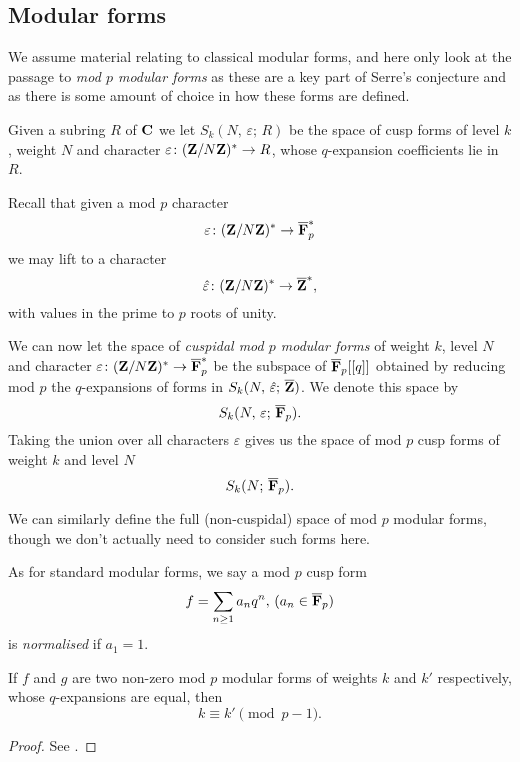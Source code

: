 \documentclass[a4paper,12pt]{article}
\begin{document}
\subsection{Modular forms}
We assume material relating to classical modular forms, and here only look at the passage to \emph{mod $p$ modular forms} as these are a key part of Serre's conjecture and as there is some amount of choice in how these forms are defined.

\begin{defn}
Given a subring $R$ of $\mathbf{C}$ we let $S_k(N,\,\varepsilon;\,R)$ be the space of cusp forms of level $k$, weight $N$ and character $\varepsilon\colon (\mathbf{Z}/N\mathbf{Z})^* \to R$, whose $q$-expansion coefficients lie in $R$.

Recall that given a mod $p$ character
\[
\varepsilon\colon (\mathbf{Z}/N\mathbf{Z})^* \to \overline{\mathbf{F}}_p^*
\]
we may lift to a character
\[
\hat{\varepsilon}\colon (\mathbf{Z}/N\mathbf{Z})^* \to \overline{\mathbf{Z}}^*,
\]
with values in the prime to $p$ roots of unity.

We can now let the space of \emph{cuspidal mod $p$ modular forms} of weight $k$, level $N$ and character $\varepsilon\colon (\mathbf{Z}/N\mathbf{Z})^* \to \overline{\mathbf{F}}_p^*$ be the subspace of $\overline{\mathbf{F}}_p[[q]]$ obtained by reducing mod $p$ the $q$-expansions of forms in $S_k(N,\,\hat{\varepsilon};\,\overline{\mathbf{Z}})$.
We denote this space by
\[
S_k(N,\,\varepsilon;\,\overline{\mathbf{F}}_p).
\]
Taking the union over all characters $\varepsilon$ gives us the space of mod $p$ cusp forms of weight $k$ and level $N$
\[
S_k(N;\,\overline{\mathbf{F}}_p).
\]

We can similarly define the full (non-cuspidal) space of mod $p$ modular forms, though we don't actually need to consider such forms here.
\end{defn}

\begin{defn}
As for standard modular forms, we say a mod $p$ cusp form
\[
f = \sum_{n\ge 1} a_n q^n,\,(a_n\in\overline{\mathbf{F}}_p)
\]
is \emph{normalised} if $a_1 = 1$.
\end{defn}

\begin{prop}\label{prop:pm1}
If $f$ and $g$ are two non-zero mod $p$ modular forms of weights $k$ and $k'$ respectively, whose $q$-expansions are equal, then
\[
k \equiv k' \pmod{p-1}.
\]
\end{prop}
\begin{proof}
See \cite{Serre73}.
\end{proof}
\end{document}
